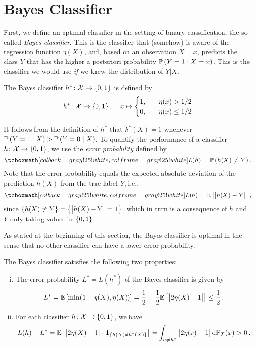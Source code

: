 \section{Bayes Classifier}

First, we define an optimal classifier in the setting of binary classification, the so-called \emph{Bayes classifier}. This is the classifier that (somehow) is aware of the regression function $\eta(X)$, and, based on an observation $X = x$, predicts the class $Y$ that has the higher a posteriori probability $\mathbb{P}\left(Y = 1 \mathrel{|} X = x\right)$. This is the classifier we would use \emph{if} we knew the distribution of $Y \vert X$.

\begin{definition}
The Bayes classifier $h^* \colon \mathcal{X} \to \left\{0,1\right\}$ is defined by
\[
    h^* \colon \mathcal{X} \to \left\{0, 1\right\}, \quad x \mapsto \begin{cases}
    1, \quad &\eta(x) > 1/2 \\
    0, \quad &\eta(x) \leq 1/2
    \end{cases}
\]
\end{definition}

It follows from the definition of $h^*$ that $h^*(X) = 1$ whenever $\mathbb{P}\left(Y = 1 \mathrel{|} X\right) > \mathbb{P}\left(Y = 0 \mathrel{|} X\right)$. To quantify the performance of a classifier $h \colon \mathcal{X} \to \left\{0, 1\right\}$, we use the \emph{error probability} defined by
\[
    \highlightMath{
        L(h) = \Pr{h(X) \neq Y}.
    }
\]
Note that the error probability equals the expected absolute deviation of the prediction $h(X)$ from the true label $Y$, i.e.,
\[
    \highlightMath{
        L(h) = \Ex{\bigAbs{ h(X) - Y }},
    }
\]
since $\left\{h(X) \neq Y\right\} = \left\{\big\lvert h(X) - Y \big\rvert = 1\right\}$, which in turn is a consequence of $h$ and $Y$ only taking values in $\left\{0, 1\right\}$.

As stated at the beginning of this section, the Bayes classifier is optimal in the sense that no other classifier can have a lower error probability.

\begin{theorem}
\label{thm: bayes classifier}
The Bayes classifier satisfies the following two properties:
\begin{enumerate}[(i)]
    \item The error probability $L^* = L(h^*)$ of the Bayes classifier is given by
        \begin{equation}
            \label{eq: bayes error}
            L^* = \mathbb{E}\left[\min(1 - \eta(X), \eta(X))\right] = \frac{1}{2} - \frac{1}{2} \mathbb{E}\left[\big\lvert 2\eta(X) - 1 \big\rvert\right] \leq \frac{1}{2} \, .
        \end{equation}

    \item For each classifier $h \colon \mathcal{X} \to \left\{0, 1\right\}$, we have
        \begin{equation}
            \label{eq: excess risk}
            L(h) - L^* = \mathbb{E}\left[\big\lvert 2\eta(X) - 1 \big\rvert \cdot \mathbf{1}_{\left\{h(X) \neq h^*(X)\right\}}\right] = \int_{h \neq h^*} \big\lvert 2\eta(x) - 1 \big\rvert\,\mathrm{d}\mathbb{P}_{X}(x) > 0 \, .
        \end{equation}
\end{enumerate}
\end{theorem}

